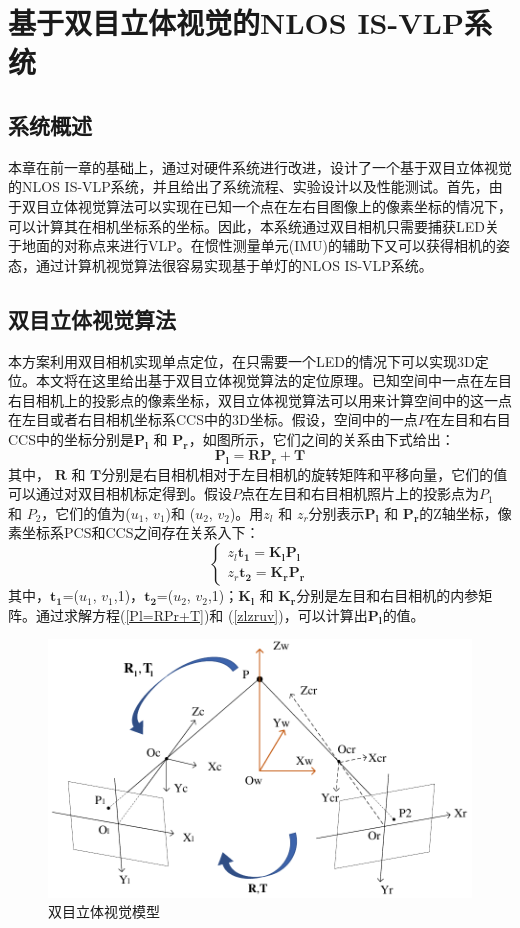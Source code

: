 \chapter{基于双目立体视觉的NLOS IS-VLP系统}
\section{系统概述}
本章在前一章的基础上，通过对硬件系统进行改进，设计了一个基于双目立体视觉的NLOS IS-VLP系统，并且给出了系统流程、实验设计以及性能测试。首先，由于双目立体视觉算法可以实现在已知一个点在左右目图像上的像素坐标的情况下，可以计算其在相机坐标系的坐标。因此，本系统通过双目相机只需要捕获LED关于地面的对称点来进行VLP。在惯性测量单元(IMU)的辅助下又可以获得相机的姿态，通过计算机视觉算法很容易实现基于单灯的NLOS IS-VLP系统。

\section{双目立体视觉算法}
本方案利用双目相机实现单点定位，在只需要一个LED的情况下可以实现3D定位。本文将在这里给出基于双目立体视觉算法的定位原理。已知空间中一点在左目右目相机上的投影点的像素坐标，双目立体视觉算法可以用来计算空间中的这一点在左目或者右目相机坐标系CCS中的3D坐标。假设，空间中的一点$P$在左目和右目CCS中的坐标分别是$\mathbf{P_{l}}$ 和 $\mathbf{P_{r}}$，如图所示，它们之间的关系由下式给出：
\begin{equation}\label{Pl=RPr+T}
\mathbf{P_{l}=RP_{r}+T}
\end{equation}
其中， $\mathbf{R}$ 和 $\mathbf{T}$分别是右目相机相对于左目相机的旋转矩阵和平移向量，它们的值可以通过对双目相机标定得到。假设$P$点在左目和右目相机照片上的投影点为$P_{1}$ 和 $P_{2}$，它们的值为($u_{1}$, $v_{1}$)和 ($u_{2}$, $v_{2}$)。用${z_{l}}$ 和 ${z_{r}}$分别表示$\mathbf{P_{l}}$ 和 $\mathbf{P_{r}}$的Z轴坐标，像素坐标系PCS和CCS之间存在关系入下：
\begin{equation}\label{zlzruv}
\begin{cases} 
  z_{l}\mathbf{t_{1}=K_{l}P_{l}}  \\
  z_{r}\mathbf{t_{2}=K_{r}P_{r}}                      
\end{cases}
\end{equation}
其中，$\mathbf{t_{1}}$=($u_{1}$, $v_{1}$,1)，$\mathbf{t_{2}}$=($u_{2}$, $v_{2}$,1)；$\mathbf{K_{l}}$ 和 $\mathbf{K_{r}}$分别是左目和右目相机的内参矩阵。通过求解方程(\ref{Pl=RPr+T})和 (\ref{zlzruv})，可以计算出$\mathbf{P_{l}}$的值。
\begin{figure}[!htbp]
  \centering
  \includegraphics[width=0.8\linewidth]{FIG/dualcamera.pdf}
 \caption{双目立体视觉模型}
\label{fig:dualcamera}
\end{figure}
